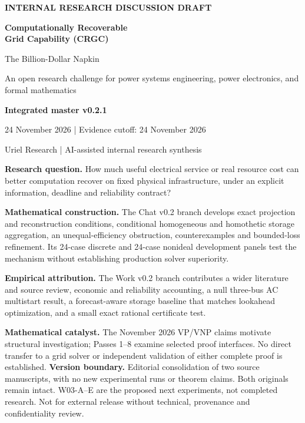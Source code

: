 \documentclass[11pt,letterpaper]{article}
\begin{document}
\hypersetup{pageanchor=false}\begin{titlepage}
{\small\bfseries INTERNAL RESEARCH DISCUSSION DRAFT\par}\vspace{1.2cm}
{\Huge\color{navy}\bfseries Computationally Recoverable\\[4pt] Grid Capability (CRGC)\par}\vspace{0.6cm}
{\LARGE The Billion-Dollar Napkin\par}\vspace{0.35cm}
{\large An open research challenge for power systems engineering, power electronics, and formal mathematics\par}\vspace{0.8cm}
{\Large\bfseries Integrated master v0.2.1\par}
24 November 2026 \quad | \quad Evidence cutoff: 24 November 2026\par
Uriel Research \quad | \quad AI-assisted internal research synthesis\par
\vspace{0.9cm}
\textbf{Research question.} How much useful electrical service or real resource cost can better computation recover on fixed physical infrastructure, under an explicit information, deadline and reliability contract?

\textbf{Mathematical construction.} The Chat v0.2 branch develops exact projection and reconstruction conditions, conditional homogeneous and homothetic storage aggregation, an unequal-efficiency obstruction, counterexamples and bounded-loss refinement. Its 24-case discrete and 24-case nonideal development panels test the mechanism without establishing production solver superiority.

\textbf{Empirical attribution.} The Work v0.2 branch contributes a wider literature and source review, economic and reliability accounting, a null three-bus AC multistart result, a forecast-aware storage baseline that matches lookahead optimization, and a small exact rational certificate test.

\textbf{Mathematical catalyst.} The November 2026 VP/VNP claims motivate structural investigation; Passes 1--8 examine selected proof interfaces. No direct transfer to a grid solver or independent validation of either complete proof is established.
\vfill
\textbf{Version boundary.} Editorial consolidation of two source manuscripts, with no new experimental runs or theorem claims. Both originals remain intact. W03-A--E are the proposed next experiments, not completed research. Not for external release without technical, provenance and confidentiality review.
\end{titlepage}\hypersetup{pageanchor=true}
\end{document}
